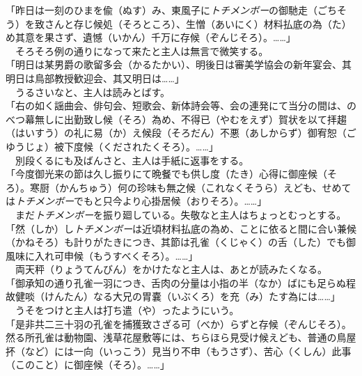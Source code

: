 「昨日は一刻のひまを偸（ぬす）み、東風子に\emph{トチメンボー}の御馳走（ごちそう）を致さんと存じ候処（そろところ）、生憎（あいにく）材料払底の為（た）め其意を果さず、遺憾（いかん）千万に存候（ぞんじそろ）。\ldots{}\ldots{}」\\

　そろそろ例の通りになって来たと主人は無言で微笑する。\\

「明日は某男爵の歌留多会（かるたかい）、明後日は審美学協会の新年宴会、其明日は鳥部教授歓迎会、其又明日は\ldots{}\ldots{}」\\

　うるさいなと、主人は読みとばす。\\

「右の如く謡曲会、俳句会、短歌会、新体詩会等、会の連発にて当分の間は、のべつ幕無しに出勤致し候（そろ）為め、不得已（やむをえず）賀状を以て拝趨（はいすう）の礼に易（か）え候段（そろだん）不悪（あしからず）御宥恕（ごゆうじょ）被下度候（くだされたくそろ）。\ldots{}\ldots{}」\\

　別段くるにも及ばんさと、主人は手紙に返事をする。\\

「今度御光来の節は久し振りにて晩餐でも供し度（たき）心得に御座候（そろ）。寒厨（かんちゅう）何の珍味も無之候（これなくそうら）えども、せめては\emph{トチメンボー}でもと只今より心掛居候（おりそろ）。\ldots{}\ldots{}」\\

　まだ\emph{トチメンボー}を振り廻している。失敬なと主人はちょっとむっとする。\\

「然（しか）し\emph{トチメンボー}は近頃材料払底の為め、ことに依ると間に合い兼候（かねそろ）も計りがたきにつき、其節は孔雀（くじゃく）の舌（した）でも御風味に入れ可申候（もうすべくそろ）。\ldots{}\ldots{}」\\

　両天秤（りょうてんびん）をかけたなと主人は、あとが読みたくなる。\\

「御承知の通り孔雀一羽につき、舌肉の分量は小指の半（なか）ばにも足らぬ程故健啖（けんたん）なる大兄の胃嚢（いぶくろ）を充（み）たす為には\ldots{}\ldots{}」\\

　うそをつけと主人は打ち遣（や）ったようにいう。\\

「是非共二三十羽の孔雀を捕獲致さざる可（べか）らずと存候（ぞんじそろ）。然る所孔雀は動物園、浅草花屋敷等には、ちらほら見受け候えども、普通の鳥屋抔（など）には一向（いっこう）見当り不申（もうさず）、苦心（くしん）此事（このこと）に御座候（そろ）。\ldots{}\ldots{}」\\

